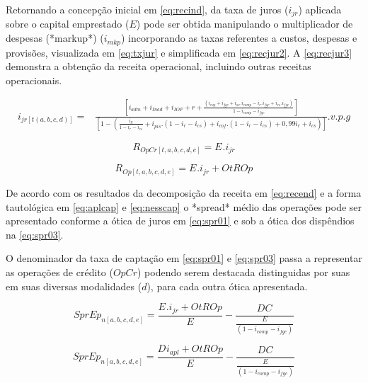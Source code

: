 \documentclass[
  12pt,
  12pt,
  openright,
  oneside,
  a4paper,
  chapter=TITLE,
  section=TITLE,
  subsection=TITLE,
  subsubsection=TITLE,
  english,
  portugues,
  sumario=tradicional]{abntex2}
\begin{document}
\begin{apendicesenv}
Retornando a concepção inicial em \autoref{eq:recind}, da taxa de juros ($i_{jr}$) aplicada sobre o capital emprestado ($E$) pode ser obtida manipulando o multiplicador de despesas (*markup*) ($i_{mkp}$) incorporando as taxas referentes a custos, despesas e provisões, visualizada em \autoref{eq:txjur} e simplificada em \autoref{eq:recjur2}. A \autoref{eq:recjur3} demonstra a obtenção da receita operacional, incluindo outras receitas operacionais.


\begin{equation}\label{eq:txjur}
\begin{aligned}
i_{jr[t(a,b,c,d)]} = & \frac{[i_{adm} + i_{Inad} + i_{IOF} + r +  \frac{(i_{cap} + i_{fgc} + i_{ac}.i_{comp} - i_{r}.i_{fgc}+ i_{cs}.i_{fgc})}{1 - i_{comp} - i_{fgc}}]}
{[1 - (\frac{i_{ll}}{1 - i_{r} - i_{cs}} + i_{pis}.(1 - i_{r} - i_{cs}) + i_{cof}.(1 - i_{r} - i_{cs}) + 0,99i_{r} + i_{cs})]}.v.p.g
\end{aligned}
\end{equation}



\begin{equation}\label{eq:recjr}
R_{OpCr[t,a,b,c,d,e]} = E_{}.i_{jr}
\end{equation}



\begin{equation}\label{eq:recjur3}
R_{Op[t,a,b,c,d,e]} = E_{}.i_{jr} + OtROp
\end{equation}


De acordo com os resultados da decomposição da receita em \autoref{eq:recend} e a forma tautológica em \autoref{eq:aplcap} e \autoref{eq:nesscap} o *spread* médio das operações pode ser apresentado conforme a ótica de juros em \autoref{eq:spr01} e sob a ótica dos dispêndios na \autoref{eq:spr03}. 

O denominador da taxa de captação em \autoref{eq:spr01} e \autoref{eq:spr03} passa a representar as operações de  crédito ($OpCr$) podendo serem destacada distinguidas por suas em  suas diversas  modalidades ($d$), para cada outra ótica apresentada. 



\begin{equation}\label{eq:spr01}
SprEp_{n[a,b,c,d,e]} =  \frac{E_{}.i_{jr} + OtROp}{E} - \frac{DC_{} }{\frac{E_{}}{(1 - i_{comp} - i_{fgc})}}
\end{equation}



\begin{equation}\label{eq:spr03}
SprEp_{n[a,b,c,d,e]} =  \frac{D_{}i_{apl} + OtROp}{E} - \frac{DC_{}}{\frac{E_{}}{(1 - i_{comp} - i_{fgc})}}
\end{equation}



\end{apendicesenv}
\end{document}
